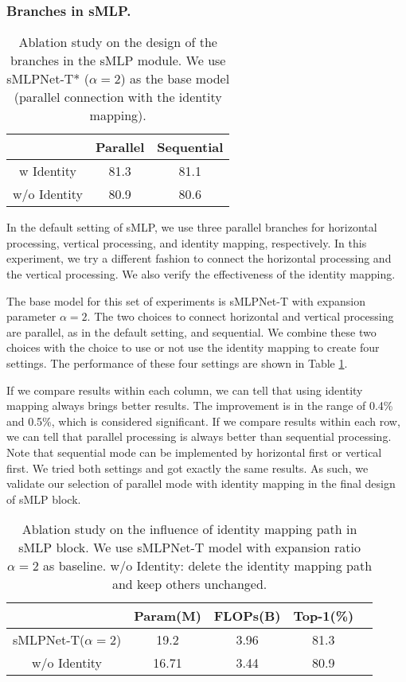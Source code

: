 \documentclass[letterpaper]{article} \usepackage{aaai22}  \usepackage{times}  \usepackage{helvet}  \usepackage{courier}  \usepackage[hyphens]{url}  \usepackage{graphicx} \usepackage{color}
\begin{document}
\subsubsection{Branches in sMLP.}
\begin{table}[t]
\centering
\begin{tabular}{c|c c}
    \hline
    & Parallel & Sequential \\
    \hline
    w Identity   &81.3 &81.1 \\
    w/o Identity &80.9 &80.6  \\
    \hline
\end{tabular}
\caption{Ablation study on the design of the branches in the sMLP module. We use sMLPNet-T* ($\alpha=2$) as the base model (parallel connection with the identity mapping).}
\label{tab:Parallel versus Sequential}
\end{table}

In the default setting of sMLP, we use three parallel branches for horizontal processing, vertical processing, and identity mapping, respectively. In this experiment, we try a different fashion to connect the horizontal processing and the vertical processing. We also verify the effectiveness of the identity mapping. 

The base model for this set of experiments is sMLPNet-T with expansion parameter $\alpha=2$. The two choices to connect horizontal and vertical processing are parallel, as in the default setting, and sequential. We combine these two choices with the choice to use or not use the identity mapping to create four settings. The performance of these four settings are shown in Table \ref{tab:Parallel versus Sequential}. 

If we compare results within each column, we can tell that using identity mapping always brings better results. The improvement is in the range of 0.4\% and 0.5\%, which is considered significant. If we compare results within each row, we can tell that parallel processing is always better than sequential processing. Note that sequential mode can be implemented by horizontal first or vertical first. We tried both settings and got exactly the same results. As such, we validate our selection of parallel mode with identity mapping in the final design of sMLP block.


\iffalse
\begin{table}[t]
\centering
\begin{tabular}{c|c c c c}
    \hline
    & Param(M) & FLOPs(B) & Top-1(\%) \\
    \hline
    sMLPNet-T($\alpha=2$)    &19.2 &3.96 &81.3  \\
    w/o Identity     &16.71 &3.44 &80.9  \\
    \hline
\end{tabular}
\caption{Ablation study on the influence of identity mapping path in sMLP block. We use sMLPNet-T model with expansion ratio $\alpha=2$ as baseline. w/o Identity: delete the identity mapping path and keep others unchanged.}
\label{tab:Identity mapping}
\end{table}
\end{document}

